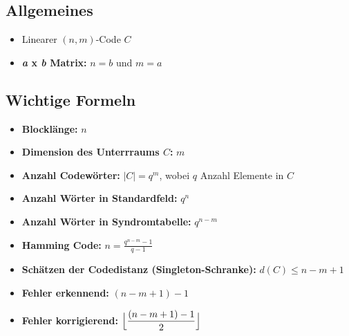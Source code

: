 \subsection{Allgemeines}

\begin{itemize}
\item Linearer $(n,m)$-Code $C$
\item \textbf{\textit{a} x \textit{b} Matrix:} $n = b$ und $m = a$
\end{itemize}

\subsection{Wichtige Formeln}

\begin{itemize}
\item \textbf{Blocklänge:} $\displaystyle n$
\item \textbf{Dimension des Unterrraums $C$:} $m$
\item \textbf{Anzahl Codewörter:} $|C| = q^m$, wobei $q$ Anzahl Elemente in $C$
\item \textbf{Anzahl Wörter in Standardfeld:} $q^n$
\item \textbf{Anzahl Wörter in Syndromtabelle:} $q^{n-m}$
\item \textbf{Hamming Code:} $\displaystyle n = \frac{q^{n-m}-1}{q-1}$
\item \textbf{Schätzen der Codedistanz (Singleton-Schranke):} $d(C) \leq n - m + 1$
\item \textbf{Fehler erkennend:} $(n - m + 1) - 1$
\item \textbf{Fehler korrigierend:} $\displaystyle \Bigl\lfloor \frac{(n - m + 1) - 1}{2} \Bigr\rfloor$
\end{itemize}